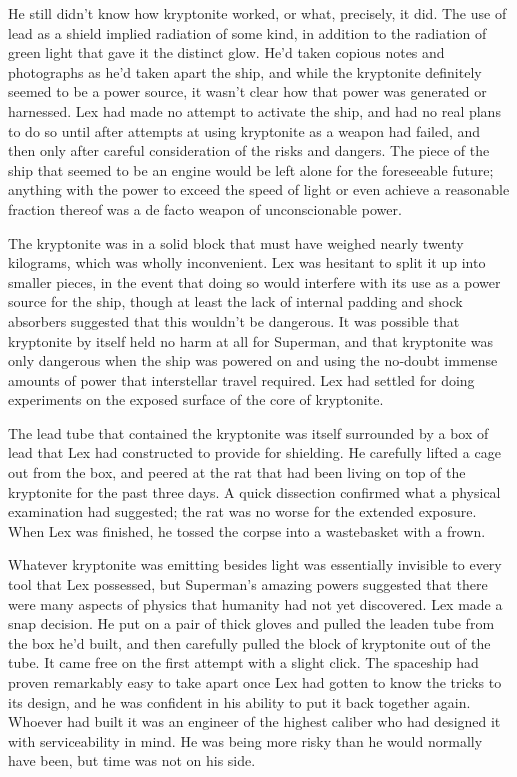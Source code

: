 He still didn't know how kryptonite worked, or what, precisely, it did.
The use of lead as a shield implied radiation of some kind, in addition
to the radiation of green light that gave it the distinct glow. He'd
taken copious notes and photographs as he'd taken apart the ship, and
while the kryptonite definitely seemed to be a power source, it wasn't
clear how that power was generated or harnessed. Lex had made no attempt
to activate the ship, and had no real plans to do so until after
attempts at using kryptonite as a weapon had failed, and then only after
careful consideration of the risks and dangers. The piece of the ship
that seemed to be an engine would be left alone for the foreseeable
future; anything with the power to exceed the speed of light or even
achieve a reasonable fraction thereof was a de facto weapon of
unconscionable power.

The kryptonite was in a solid block that must have weighed nearly twenty
kilograms, which was wholly inconvenient. Lex was hesitant to split it
up into smaller pieces, in the event that doing so would interfere with
its use as a power source for the ship, though at least the lack of
internal padding and shock absorbers suggested that this wouldn't be
dangerous. It was possible that kryptonite by itself held no harm at all
for Superman, and that kryptonite was only dangerous when the ship was
powered on and using the no‐doubt immense amounts of power that
interstellar travel required. Lex had settled for doing experiments on
the exposed surface of the core of kryptonite.

The lead tube that contained the kryptonite was itself surrounded by a
box of lead that Lex had constructed to provide for shielding. He
carefully lifted a cage out from the box, and peered at the rat that had
been living on top of the kryptonite for the past three days. A quick
dissection confirmed what a physical examination had suggested; the rat
was no worse for the extended exposure. When Lex was finished, he tossed
the corpse into a wastebasket with a frown.

Whatever kryptonite was emitting besides light was essentially invisible
to every tool that Lex possessed, but Superman's amazing powers
suggested that there were many aspects of physics that humanity had not
yet discovered. Lex made a snap decision. He put on a pair of thick
gloves and pulled the leaden tube from the box he'd built, and then
carefully pulled the block of kryptonite out of the tube. It came free
on the first attempt with a slight click. The spaceship had proven
remarkably easy to take apart once Lex had gotten to know the tricks to
its design, and he was confident in his ability to put it back together
again. Whoever had built it was an engineer of the highest caliber who
had designed it with serviceability in mind. He was being more risky
than he would normally have been, but time was not on his side.


